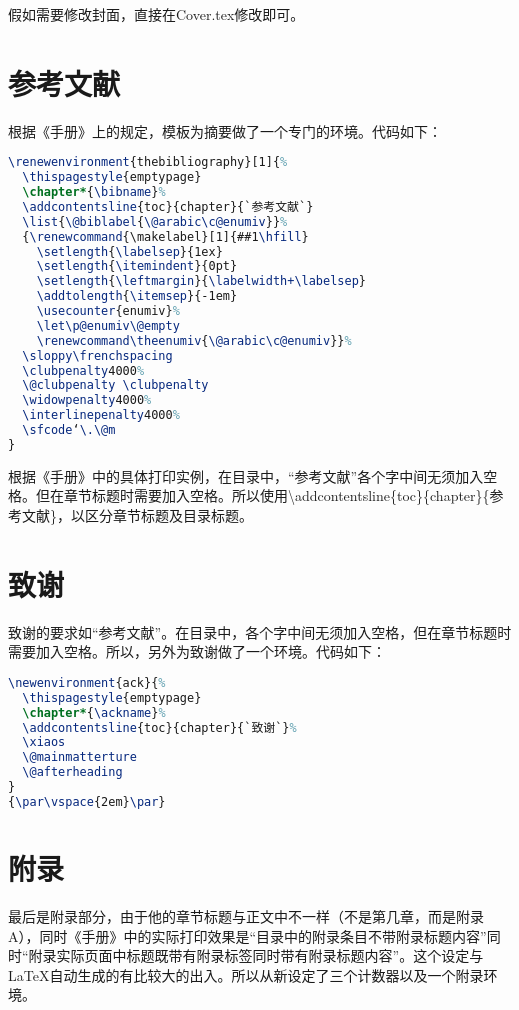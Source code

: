 假如需要修改封面，直接在Cover.tex修改即可。

\section{参考文献}
根据《手册》上的规定，模板为摘要做了一个专门的环境。代码如下：

\begin{lstlisting}[language=TeX]
\renewenvironment{thebibliography}[1]{%
  \thispagestyle{emptypage}
  \chapter*{\bibname}%
  \addcontentsline{toc}{chapter}{`参考文献`}
  \list{\@biblabel{\@arabic\c@enumiv}}%
  {\renewcommand{\makelabel}[1]{##1\hfill}
    \setlength{\labelsep}{1ex}
    \setlength{\itemindent}{0pt}
    \setlength{\leftmargin}{\labelwidth+\labelsep}
    \addtolength{\itemsep}{-1em}
    \usecounter{enumiv}%
    \let\p@enumiv\@empty
    \renewcommand\theenumiv{\@arabic\c@enumiv}}%
  \sloppy\frenchspacing
  \clubpenalty4000%
  \@clubpenalty \clubpenalty
  \widowpenalty4000%
  \interlinepenalty4000%
  \sfcode‘\.\@m
}
\end{lstlisting}

根据《手册》中的具体打印实例，在目录中，“参考文献”各个字中间无须加入空格。但在章节标题时需要加入空格。所以使用\textbackslash addcontentsline\{toc\}\{chapter\}\{参考文献\}，以区分章节标题及目录标题。

\section{致谢}
致谢的要求如“参考文献”。在目录中，各个字中间无须加入空格，但在章节标题时需要加入空格。所以，另外为致谢做了一个环境。代码如下：

\begin{lstlisting}[language=TeX]
\newenvironment{ack}{%
  \thispagestyle{emptypage}
  \chapter*{\ackname}%
  \addcontentsline{toc}{chapter}{`致谢`}%
  \xiaos
  \@mainmatterture
  \@afterheading
}
{\par\vspace{2em}\par}
\end{lstlisting}

\section{附录}
\label{sec:appendix}
最后是附录部分，由于他的章节标题与正文中不一样（不是第几章，而是附录A），同时《手册》中的实际打印效果是“目录中的附录条目不带附录标题内容”同时“附录实际页面中标题既带有附录标签同时带有附录标题内容”。这个设定与\LaTeX{}自动生成的有比较大的出入。所以从新设定了三个计数器以及一个附录环境。

